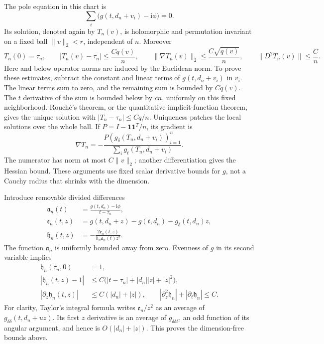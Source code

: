 \documentclass[11pt]{article}
\numberwithin{equation}{section}
\theoremstyle{definition}
\newcommand{\ii}{\mathrm i}
\begin{document}
The pole equation in this chart is
\[
 \sum_i\bigl(g(t,d_n+v_i)-\ii\phi\bigr)=0 .
 \]
Its solution, denoted again by \(T_n(v)\), is holomorphic and
permutation invariant on a fixed ball \(\|v\|_2<r\), independent
of \(n\).  Moreover
\begin{equation}
 T_n(0)=\tau_n,\qquad
 |T_n(v)-\tau_n|\le\frac{Cq(v)}n,\qquad
 \|\nabla T_n(v)\|_2\le\frac{C\sqrt{q(v)}}n,\qquad
 \|D^2T_n(v)\|\le\frac Cn .
 \label{neg:implicit-estimates}
\end{equation}
Here and below operator norms are induced by the Euclidean norm.
To prove these estimates, subtract the constant and linear terms
of \(g(t,d_n+v_i)\) in \(v_i\).  The linear terms sum to zero,
and the remaining sum is bounded by \(Cq(v)\).  The \(t\)
derivative of the sum is bounded below by \(cn\), uniformly on
this fixed neighborhood.  Rouch\'e's theorem, or the quantitative
implicit-function theorem, gives the unique solution with
\(|T_n-\tau_n|\le Cq/n\).  Uniqueness patches the local solutions
over the whole ball.  If
\(P=I-\mathbf1\mathbf1^T/n\), its gradient is
\[
 \nabla T_n
 =-\frac{P(g_\delta(T_n,d_n+v_i))_{i=1}^n}
          {\sum_i g_t(T_n,d_n+v_i)} .
 \]
The numerator has norm at most \(C\|v\|_2\); another
differentiation gives the Hessian bound.  These arguments use
fixed scalar derivative bounds for \(g\), not a Cauchy radius
that shrinks with the dimension.

Introduce removable divided differences
\begin{align}
 \mathfrak a_n(t)
   &=\frac{g(t,d_n)-\ii\phi}{t-\tau_n},\\
 \mathfrak e_n(t,z)
   &=g(t,d_n+z)-g(t,d_n)-g_\delta(t,d_n)z,\\
 \mathfrak h_n(t,z)
   &=-\frac{2\mathfrak e_n(t,z)}
             {h_n\mathfrak a_n(t)z^2}.
 \label{neg:divided-functions}
\end{align}
The function \(\mathfrak a_n\) is uniformly bounded away from zero.
Evenness of \(g\) in its second variable implies
\begin{align}
 \mathfrak h_n(\tau_n,0)&=1,\\
 |\mathfrak h_n(t,z)-1|
   &\le C\bigl(|t-\tau_n|+|d_n||z|+|z|^2\bigr),\\
 |\partial_z\mathfrak h_n(t,z)|
   &\le C(|d_n|+|z|),\qquad
 |\partial_z^2\mathfrak h_n|+|\partial_t\mathfrak h_n|\le C .
 \label{neg:divided-bounds}
\end{align}
For clarity, Taylor's integral formula writes
\(\mathfrak e_n/z^2\) as an average of
\(g_{\delta\delta}(t,d_n+uz)\).  Its first \(z\) derivative
is an average of \(g_{\delta\delta\delta}\), an odd function
of its angular argument, and hence is \(O(|d_n|+|z|)\).
This proves the dimension-free bounds above.
\end{document}
